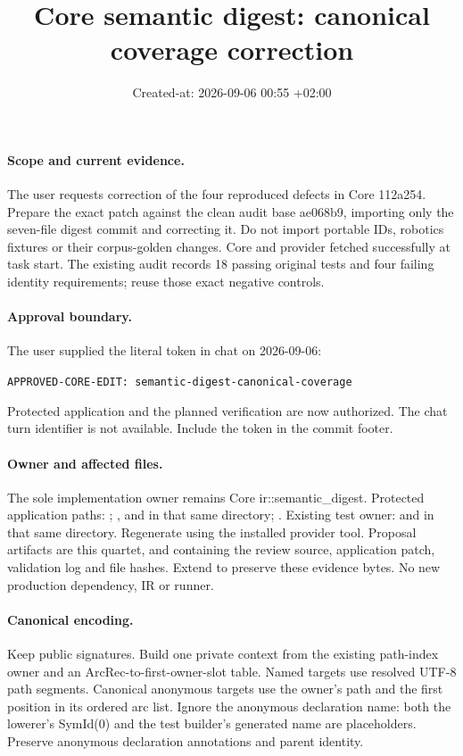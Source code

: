 \documentclass[11pt,a4paper]{article}
\title{Core semantic digest: canonical coverage correction}
\date{Created-at: 2026-09-06 00:55 +02:00}
\begin{document}
\maketitle
\paragraph{Scope and current evidence.}
The user requests correction of the four reproduced defects in Core 112a254.
Prepare the exact patch against the clean audit base ae068b9, importing only
the seven-file digest commit and correcting it. Do not import portable IDs,
robotics fixtures or their corpus-golden changes. Core and provider fetched
successfully at task start. The existing audit records 18 passing original
tests and four failing identity requirements; reuse those exact negative controls.

\paragraph{Approval boundary.}
The user supplied the literal token in chat on 2026-09-06:
\par\noindent\texttt{APPROVED-CORE-EDIT: semantic-digest-canonical-coverage}
\par\noindent
Protected application and the planned verification are now authorized.
The chat turn identifier is not available. Include the token in the commit footer.

\paragraph{Owner and affected files.}
The sole implementation owner remains Core ir::semantic\_digest. Protected
application paths: ; ,
 and  in that same directory;
.
Existing test owner:  and
 in that same directory.
Regenerate  using the installed provider tool.
Proposal artifacts are this quartet,
 and
 containing the review source,
application patch, validation log and file hashes. Extend 
to preserve these evidence bytes. No new production dependency, IR or runner.

\paragraph{Canonical encoding.}
Keep public signatures. Build one private context from the existing path-index
owner and an ArcRec-to-first-owner-slot table. Named targets use resolved UTF-8
path segments. Canonical anonymous targets use the owner's path and the first
position in its ordered arc list. Ignore the anonymous declaration name: both
the lowerer's SymId(0) and the test builder's generated name are placeholders.
Preserve anonymous declaration annotations and parent identity.
\end{document}
